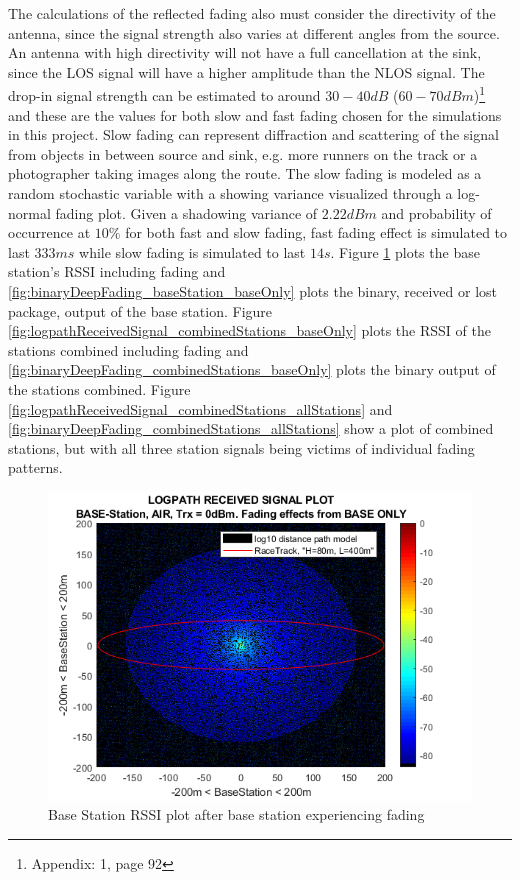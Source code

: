 \noindent The calculations of the reflected fading also must consider the directivity of the antenna, since the signal strength also varies at different angles from the source. An antenna with high directivity will not have a full cancellation at the sink, since the LOS signal will have a higher amplitude than the NLOS signal. The drop-in signal strength can be estimated to around $30-40dB$ ($60-70dBm$)\footnote{Appendix: 1, page 92} and these are the values for both slow and fast fading chosen for the simulations in this project. Slow fading can represent diffraction and scattering of the signal from objects in between source and sink, e.g. more runners on the track or a photographer taking images along the route. The slow fading is modeled as a random stochastic variable with a showing variance visualized through a log-normal fading plot. Given a shadowing variance of $2.22dBm$ and probability of occurrence at $10\%$ for both fast and slow fading, fast fading effect is simulated to last $333 ms$ while slow fading is simulated to last $14s$. Figure \ref{fig:logpathReceivedSignal_baseStation_baseOnly} plots the base station's RSSI including fading and \ref{fig:binaryDeepFading_baseStation_baseOnly} plots the binary, received or lost package, output of the base station. Figure \ref{fig:logpathReceivedSignal_combinedStations_baseOnly} plots the RSSI of the stations combined including fading and \ref{fig:binaryDeepFading_combinedStations_baseOnly} plots the binary output of the stations combined. Figure \ref{fig:logpathReceivedSignal_combinedStations_allStations} and \ref{fig:binaryDeepFading_combinedStations_allStations} show a plot of combined stations, but with all three station signals being victims of individual fading patterns. 

\begin{figure}[H]
	\centering
	\includegraphics[width=\linewidth]{theory/fading/fig/logpathReceivedSignal_baseStation_baseOnly.png}
	\caption{Base Station RSSI plot after base station experiencing fading}
	\label{fig:logpathReceivedSignal_baseStation_baseOnly}
\end{figure}

